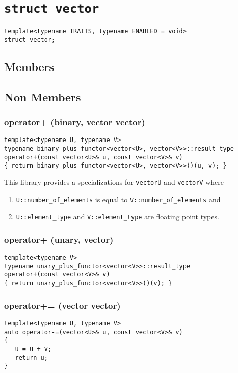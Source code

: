 \documentclass[oneside]{book}
\begin{document}
\section{\texttt{struct vector}}
\begin{verbatim}
template<typename TRAITS, typename ENABLED = void>
struct vector;
\end{verbatim}

\subsection{Members}

\subsection{Non Members}
\subsubsection{operator+ (binary, vector vector)}
\begin{verbatim}
template<typename U, typename V>
typename binary_plus_functor<vector<U>, vector<V>>::result_type
operator+(const vector<U>& u, const vector<V>& v)
{ return binary_plus_functor<vector<U>, vector<V>>()(u, v); }
\end{verbatim}
This library provides a specializations for \texttt{vector\textlangle U\textrangle}
and \texttt{vector\textlangle V\textrangle} where
\begin{enumerate}
	\item \texttt{U::number\_of\_elements} is equal to \texttt{V::number\_of\_elements} and
	\item \texttt{U::element\_type} and \texttt{V::element\_type} are floating point types.
\end{enumerate}

\subsubsection{operator+ (unary, vector)}
\begin{verbatim}
template<typename V>
typename unary_plus_functor<vector<V>>::result_type
operator+(const vector<V>& v)
{ return unary_plus_functor<vector<V>>()(v); }
\end{verbatim}

\subsubsection{operator+= (vector vector)}
\begin{verbatim}
template<typename U, typename V>
auto operator-=(vector<U>& u, const vector<V>& v)
{
   u = u + v;
   return u;
}
\end{verbatim}
\end{document}
